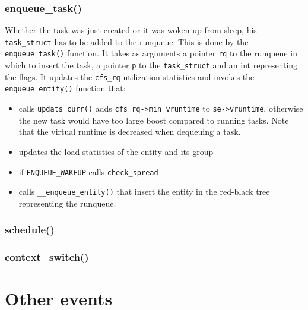 \documentclass[10pt]{book}
\begin{document}
\subsubsection{enqueue\_task()}
Whether the task was just created or it was woken up from sleep, his \verb|task_struct| has to be added to the runqueue. This is done by the \verb|enqueue_task()| function. It takes as arguments a pointer \verb|rq| to the runqueue in which to insert the task, a pointer \verb|p| to the \verb|task_struct| and an int representing the flags. It updates the \verb|cfs_rq| utilization statistics and invokes the \verb|enqueue_entity()| function that:
\begin{itemize}
    \item calls \verb|updats_curr()| adds \verb|cfs_rq->min_vruntime| to \verb|se->vruntime|, otherwise the new task would have too large boost compared to running tasks. Note that the virtual runtime is decreased when dequeuing a task.
    \item updates the load statistics of the entity and its group
    \item if \verb|ENQUEUE_WAKEUP| calls \verb|check_spread|
    \item calls \verb|__enqueue_entity()| that insert the entity in the red-black tree representing the runqueue.
\end{itemize}

\subsubsection{schedule()}

\subsubsection{context\_switch()}

\section{Other events} %
\label{sec:other_events}
\end{document}
